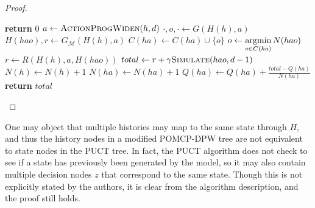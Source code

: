 \begin{proof}
\begin{algorithm}[htb]
\begin{algorithmic}[1]
                \State \textbf{return} $0$
            \EndIf
            \State $a \gets \Call{ActionProgWiden}{h, d}$
                \State $\cdot, o, \cdot \gets G(H(h), a)$
                \State $H(hao),r \gets G_\mathcal{M}(H(h),a)$
                \State $C(ha) \gets C(ha) \cup \{o\}$
            \Else
                \State $o \gets \underset{o \in C(ha)}{\argmin}\, N(hao)$
                \State $r \gets R(H(h), a, H(hao))$
            \EndIf
            \State $total \gets r + \gamma \Call{Simulate}{hao, d-1}$
            \State $N(h) \gets N(h)+1$
            \State $N(ha) \gets N(ha)+1$
            \State $Q(ha) \gets Q(ha) + \frac{total - Q(ha)}{N(ha)}$
            \State \textbf{return} $total$
        \EndProcedure
    \end{algorithmic}
\end{algorithm}

\end{proof}

\begin{remark}
    One may object that multiple histories may map to the same state through $H$, and thus the history nodes in a modified POMCP-DPW tree are not equivalent to state nodes in the PUCT tree. In fact, the PUCT algorithm does not check to see if a state has previously been generated by the model, so it may also contain multiple decision nodes $z$ that correspond to the same state. Though this is not explicitly stated by the authors, it is clear from the algorithm description, and the proof still holds.
\end{remark}
